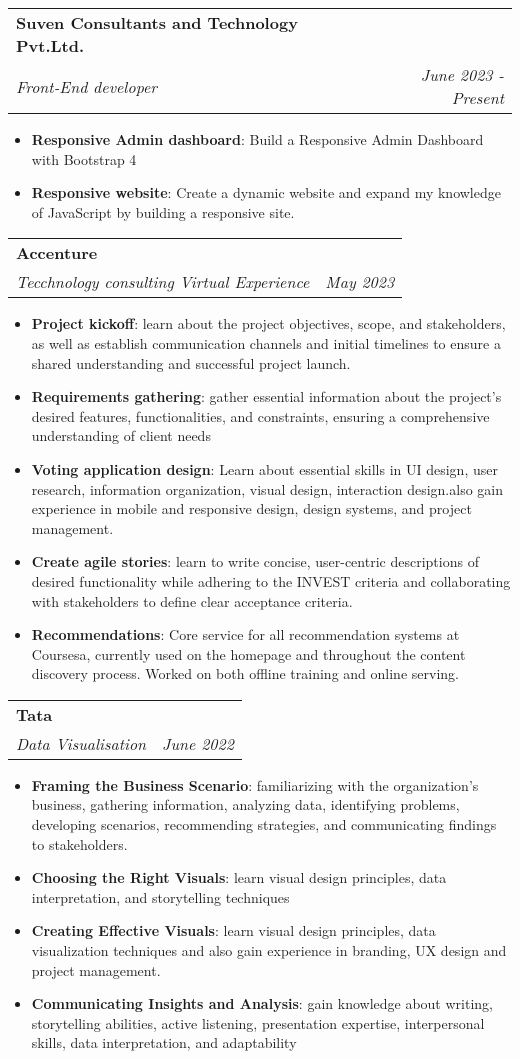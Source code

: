 \documentclass[letterpaper,11pt]{article}
\makeatletter
\newcommand{\resumeItem}[2]{
  \item\small{
    \textbf{#1}{: #2 \vspace{-2pt}}
  }
}
\newcommand{\resumeSubheading}[4]{
  \vspace{-1pt}\item
    \begin{tabular*}{0.97\textwidth}{l@{\extracolsep{\fill}}r}
      \textbf{#1} & #2 \\
      \textit{\small#3} & \textit{\small #4} \\
    \end{tabular*}\vspace{-5pt}
}
\newcommand{\resumeItemListStart}{\begin{itemize}}
\newcommand{\resumeItemListEnd}{\end{itemize}\vspace{-5pt}}
\makeatother
\begin{document}
    \resumeSubheading
      {Suven Consultants and Technology Pvt.Ltd.}{}
      {Front-End developer}{June 2023 - Present}
      \resumeItemListStart
        \resumeItem{Responsive Admin dashboard}
          {Build a Responsive Admin Dashboard with Bootstrap 4}
        \resumeItem{Responsive website}
          {Create a dynamic website and expand my knowledge of JavaScript by building a responsive site.}
      \resumeItemListEnd
      

    \resumeSubheading
      {Accenture}{}
      {Tecchnology consulting Virtual Experience }{ May 2023 }
      \resumeItemListStart
          
        \resumeItem{Project kickoff}
        {learn about the project objectives, scope, and stakeholders, as well as establish communication channels and initial timelines to ensure a shared understanding and successful project launch.}
          
        \resumeItem{Requirements gathering}
          {gather essential information about the project's desired features, functionalities, and constraints, ensuring a comprehensive understanding of client needs }
        \resumeItem{Voting application design}
          {Learn about essential skills in UI design, user research, information organization, visual design, interaction design.also gain experience in mobile and responsive design, design systems, and project management.}
        \resumeItem{Create agile stories}
          {learn to write concise, user-centric descriptions of desired functionality while adhering to the INVEST criteria and collaborating with stakeholders to define clear acceptance criteria.}
        \resumeItem{Recommendations}
          {Core service for all recommendation systems at Coursesa, currently used on the homepage and throughout the content discovery process. Worked on both offline training and online serving.}
      \resumeItemListEnd

    \resumeSubheading
      {Tata}{}
      {Data Visualisation}{June 2022}
      \resumeItemListStart
        \resumeItem{Framing the Business Scenario}
          {familiarizing with the organization's business, gathering information, analyzing data, identifying problems, developing scenarios, recommending strategies, and communicating findings to stakeholders.}
        \resumeItem{Choosing the Right Visuals}
          {learn visual design principles, data interpretation, and storytelling techniques}
          \resumeItem{Creating Effective Visuals}
          {learn visual design principles, data visualization techniques and also gain experience in branding, UX design and project management.}
          \resumeItem{Communicating Insights and Analysis}
          {gain knowledge about writing, storytelling abilities, active listening, presentation expertise, interpersonal skills, data interpretation, and adaptability}
      \resumeItemListEnd
\end{document}
